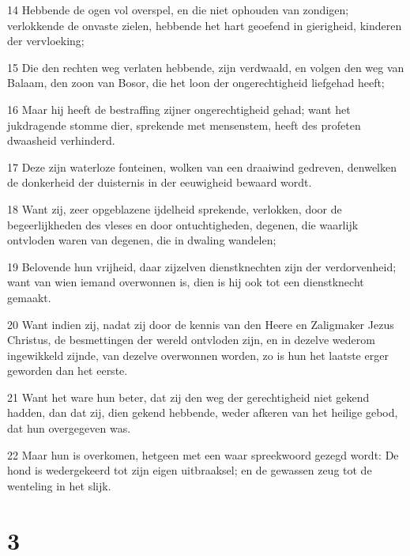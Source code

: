 \par 14 Hebbende de ogen vol overspel, en die niet ophouden van zondigen; verlokkende de onvaste zielen, hebbende het hart geoefend in gierigheid, kinderen der vervloeking;
\par 15 Die den rechten weg verlaten hebbende, zijn verdwaald, en volgen den weg van Balaam, den zoon van Bosor, die het loon der ongerechtigheid liefgehad heeft;
\par 16 Maar hij heeft de bestraffing zijner ongerechtigheid gehad; want het jukdragende stomme dier, sprekende met mensenstem, heeft des profeten dwaasheid verhinderd.
\par 17 Deze zijn waterloze fonteinen, wolken van een draaiwind gedreven, denwelken de donkerheid der duisternis in der eeuwigheid bewaard wordt.
\par 18 Want zij, zeer opgeblazene ijdelheid sprekende, verlokken, door de begeerlijkheden des vleses en door ontuchtigheden, degenen, die waarlijk ontvloden waren van degenen, die in dwaling wandelen;
\par 19 Belovende hun vrijheid, daar zijzelven dienstknechten zijn der verdorvenheid; want van wien iemand overwonnen is, dien is hij ook tot een dienstknecht gemaakt.
\par 20 Want indien zij, nadat zij door de kennis van den Heere en Zaligmaker Jezus Christus, de besmettingen der wereld ontvloden zijn, en in dezelve wederom ingewikkeld zijnde, van dezelve overwonnen worden, zo is hun het laatste erger geworden dan het eerste.
\par 21 Want het ware hun beter, dat zij den weg der gerechtigheid niet gekend hadden, dan dat zij, dien gekend hebbende, weder afkeren van het heilige gebod, dat hun overgegeven was.
\par 22 Maar hun is overkomen, hetgeen met een waar spreekwoord gezegd wordt: De hond is wedergekeerd tot zijn eigen uitbraaksel; en de gewassen zeug tot de wenteling in het slijk.

\chapter{3}

